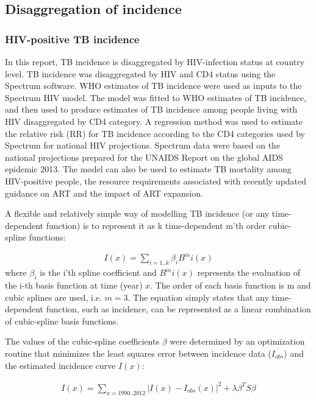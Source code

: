 \subsection{Disaggregation of incidence}
\subsubsection{HIV-positive TB incidence}

In this report, TB incidence is disaggregated by HIV-infection status at country level. TB incidence was disaggregated by HIV and CD4 status using the Spectrum software\cite{Stover2012}. WHO estimates of TB incidence were used as inputs to the Spectrum HIV model. The model was fitted to WHO estimates of TB incidence, and then used to produce estimates of TB incidence among people living with HIV disaggregated by CD4 category\cite{Pretorius2014}. A regression method was used to estimate the relative risk (RR) for TB incidence according to the CD4 categories used by Spectrum for national HIV projections\cite{J2010}. Spectrum data were based on the national projections prepared for the UNAIDS Report on the global AIDS epidemic 2013. The model can also be used to  estimate TB mortality among HIV-positive people, the resource requirements associated with  recently updated guidance on ART and the impact of ART expansion. 

A flexible and relatively simple way of modelling TB incidence (or any time-dependent function) is to represent it as k time-dependent m’th order cubic-spline functions:

\begin{align*}
I(x) = \sum_{i=1 .. k} \beta_i B^m i(x)
\end{align*}
where $\beta_i$ is the i'th spline coefficient and $B^m i(x)$ represents the evaluation of the i-th basis function at time (year) $x$. The order of each basis function is m and cubic splines are used, i.e. $m=3$. The equation simply states that any time-dependent function, such as incidence, can be represented as a linear combination of cubic-spline basis functions.

The values of the cubic-spline coefficients $\beta$ were determined by an optimization routine that minimizes the least squares error between incidence data ($I_{obs}$) and the estimated incidence curve $I(x)$:

\begin{align*}
I(x) = \sum_{x = 1990 .. 2012} | I(x) - I_{obs} (x)|^2 + \lambda \beta^T S \beta
\end{align*}

